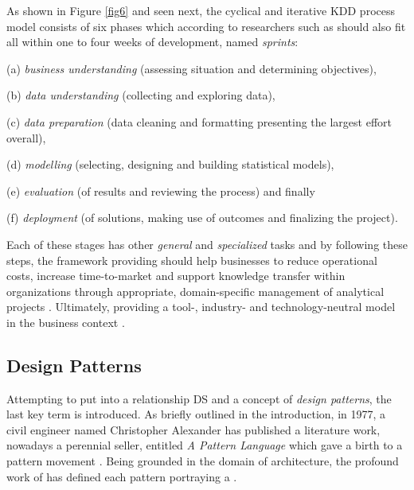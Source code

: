 As shown in Figure \ref{fig6} and seen next, the cyclical and iterative \ac{KDD} process model consists of six phases which according to researchers such as \textcite{JurneyRus2013} should also fit all within one to four weeks of development, named \emph{sprints}:
\begin{compactitem}
    \item [(a)] \emph{business understanding} (assessing situation and determining objectives),
    \item [(b)] \emph{data understanding} (collecting and exploring data),
    \item [(c)] \emph{data preparation} (data cleaning and formatting presenting the largest effort overall),
    \item [(d)] \emph{modelling} (selecting, designing and building statistical models),
    \item [(e)] \emph{evaluation} (of results and reviewing the process) and finally
    \item [(f)] \emph{deployment} (of solutions, making use of outcomes and finalizing the project).
\end{compactitem}
Each of these stages has other \emph{general} and \emph{specialized} tasks and by following these steps, the framework providing  should help businesses to reduce operational costs, increase time-to-market and support knowledge transfer within organizations through appropriate, domain-specific management of analytical projects \parencites[16]{ThomasZeutschler2016ITAnalytics}{Horvath2011}.
Ultimately, providing a tool-, industry- and technology-neutral model in the business context \parencites{PeteChapman2004CRISP-DMGuide}.

\subsection{Design Patterns}
\label{dp-intro}
Attempting to put into a relationship \ac{DS} and a concept of \emph{design patterns}, the last key term is introduced. 
As briefly outlined in the introduction, in 1977, a civil engineer named Christopher Alexander has published a literature work, nowadays a perennial seller, entitled \emph{A Pattern Language} which gave a birth to a pattern movement \parencites{SalingarosSOMEALEXANDER}{DongPan1998TheEngine}. 
Being grounded in the domain of architecture, the profound work of \textcite{Alexander1977} has defined each pattern portraying a  \parencites[93]{Spinellis1999}. 

